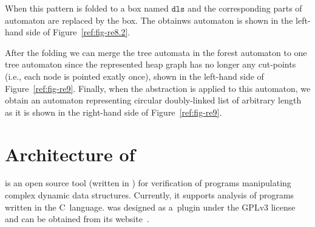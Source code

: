 {When this pattern is folded to a box named $\mathtt{dls}$ and the corresponding parts of automaton are replaced by the box.
The obtainws automaton is shown in the left-hand side of Figure~\ref{ref:fig-re8.2}.

After the folding we can merge the tree automata in the forest automaton to one tree automaton
since the represented heap graph has no longer any cut-points (i.e., each node is pointed exatly once), shown in the left-hand side of Figure~\ref{ref:fig-re9}.
Finally, when the abstraction is applied to this automaton, we obtain an automaton representing circular
doubly-linked list of arbitrary length as it is shown in the right-hand side of Figure~\ref{ref:fig-re9}.


\section{Architecture of \forester}
\label{sub:forestervata}

\forester is an open source tool (written in \cpp) for verification of programs
manipulating complex dynamic data structures.
Currently, it supports analysis of programs written in the C~language.
\forester was designed as a~\gcc plugin under the GPLv3 license
and can be obtained from its website~\cite{foresterweb}.%


}
